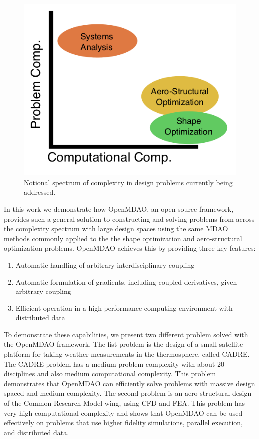 \documentclass[]{aiaa-tc} %
\begin{document}
    \begin{figure}[!hbt]\begin{center}
      \includegraphics[width=.5\textwidth]{images/complexity_cartoon}
      \caption{ Notional spectrum of complexity in design problems currently being addressed. \label{fig:complexity_cartoon}}
    \end{center}\end{figure}

    In this work we demonstrate how OpenMDAO, an open-source framework, provides such a general
    solution to constructing and solving problems from across the complexity spectrum with large design spaces
    using the same MDAO methods commonly applied to the the shape optimization and aero-structural optimization
    problems. OpenMDAO achieves this by providing three key features:

    \begin{enumerate}
      \item Automatic handling of arbitrary interdisciplinary coupling
      \item Automatic formulation of gradients, including coupled derivatives, given arbitrary coupling
      \item Efficient operation in a high performance computing environment with distributed data
    \end{enumerate}

    To demonstrate these capabilities, we present two different problem solved with
    the OpenMDAO framework. The fist problem is the design of a small satellite
    platform for taking weather measurements in the thermosphere, called CADRE. The CADRE problem has a
    medium problem complexity with about 20 disciplines and also medium computational complexity.
    This problem demonstrates that OpenMDAO can efficiently solve problems with massive design spaced and
    medium complexity. The second problem is an aero-structural design of
    the Common Research Model wing, using CFD and FEA. This problem has very high computational
    complexity and shows that OpenMDAO can be used effectively on problems that use higher fidelity
    simulations, parallel execution, and distributed data.
\end{document}
